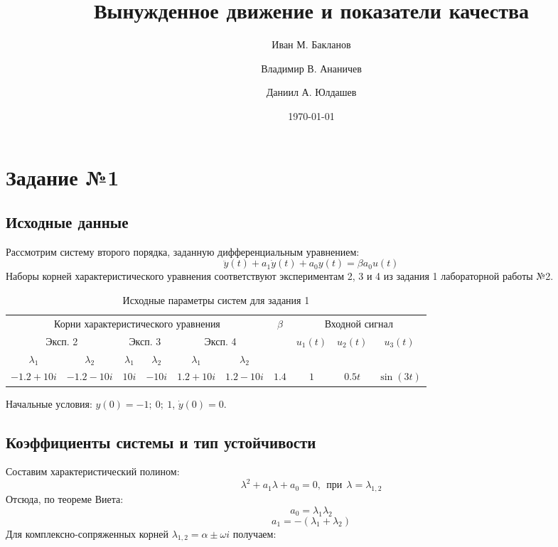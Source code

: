 \documentclass[a4paper, 12pt]{article}
\title{
Вынужденное движение и показатели качества
}
\author{Иван М. Бакланов}
\affil{465112, ibaklanov@niuitmo.ru}
\author{Владимир В. Ананичев}
\affil{464994, vandmitrievic@mail.ru}
\author{Даниил А. Юлдашев}
\affil{468158}
\date{\today}
\begin{document}
\maketitle

\tableofcontents

\newpage
\section{Задание №1}
\subsection{Исходные данные}
Рассмотрим систему второго порядка, заданную дифференциальным уравнением:
\[
    \ddot{y}(t) + a_1\dot{y}(t) + a_0y(t) = \beta a_0 u(t)
\]
Наборы корней характеристического уравнения соответствуют экспериментам 2, 3 и 4 из задания 1 лабораторной работы №2.
\renewcommand{\arraystretch}{1.3}
\begin{table}[H]
\centering
\caption{Исходные параметры систем для задания 1}
\label{tab:1}
\begin{tabular}{|c|c|c|c|c|c|c|c|c|c|}
    \hline
    \multicolumn{6}{|c|}{Корни характеристического уравнения} & \multirow{3}{*}{$\beta$} & \multicolumn{3}{c|}{Входной сигнал} \\ \cline{1-6} \cline{8-10}
    \multicolumn{2}{|c|}{Эксп. 2} & \multicolumn{2}{c|}{Эксп. 3} & \multicolumn{2}{c|}{Эксп. 4} & & \multirow{2}{*}{$u_1(t)$} & \multirow{2}{*}{$u_2(t)$} & \multirow{2}{*}{$u_3(t)$} \\ \cline{1-6}
    $\lambda_1$ & $\lambda_2$ & $\lambda_1$ & $\lambda_2$ & $\lambda_1$ & $\lambda_2$ & & & & \\ \hline
    $-1.2 + 10i$ & $-1.2 - 10i$ & $10i$ & $-10i$ & $1.2 + 10i$ & $1.2 - 10i$ & $1.4$ & $1$ & $0.5t$ & $\sin{(3t)}$ \\ \hline
\end{tabular}
\end{table}
Начальные условия: $y(0) = -1;\ 0;\ 1$, $\dot{y}(0) = 0$.

\subsection{Коэффициенты системы и тип устойчивости}
Составим характеристический полином:
\[
    \lambda^2 + a_1 \lambda + a_0 = 0, \ \ \textit{при} \ \ \lambda = \lambda_{1,2}
\]
Отсюда, по теореме Виета:
\[
    a_0 = \lambda_1 \lambda_2
\]
\[
    a_1 = -(\lambda_1 + \lambda_2)
\]
Для комплексно-сопряженных корней $\lambda_{1,2} = \alpha \pm \omega i$ получаем:
\end{document}
